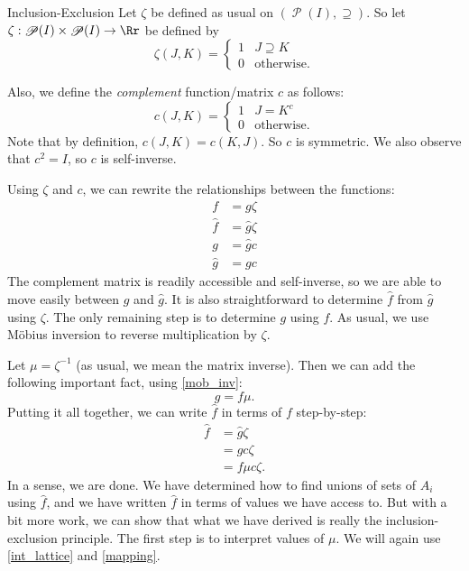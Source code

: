 \documentclass[12pt]{pom_thesis}
\DeclareMathOperator{\ps}{\mathscr{P}}
\begin{document}
\begin{chapter}{Inclusion-Exclusion}
Let $\zeta$ be defined as usual on $(\ps(I), \supseteq)$. So let $\zeta:\ps(I) \times \ps(I) \rightarrow \Rr$ be defined by
\[
\zeta(J,K) = \begin{cases} 1 & J \supseteq K \\ 0 & \text{otherwise}. \end{cases}
\]

Also, we define the \emph{complement} function/matrix $c$ as follows:
\[
c(J,K) = \begin{cases} 1 & J = K^c \\ 0 & \text{otherwise}. \end{cases}
\]
Note that by definition, $c(J,K) = c(K,J)$. So $c$ is symmetric. We also observe that $c^2 = I$, so $c$ is self-inverse. 

Using $\zeta$ and $c$, we can rewrite the relationships between the functions:
\begin{align*}
f &= g\zeta\\
\hat{f} &= \hat{g}\zeta\\
g &= \hat{g}c\\
\hat{g} &= gc
\end{align*}
The complement matrix is readily accessible and self-inverse, so we are able to move easily between $g$ and $\hat{g}$. It is also straightforward to determine $\hat{f}$ from $\hat{g}$ using $\zeta$. The only remaining step is to determine $g$ using $f$. As usual, we use M\"obius inversion to reverse multiplication by $\zeta$.

Let $\mu = \zeta^{-1}$ (as usual, we mean the matrix inverse). Then we can add the following important fact, using \ref{mob_inv}:
\[
g = f\mu.
\]
Putting it all together, we can write $\hat{f}$ in terms of $f$ step-by-step:
\begin{align*}
\hat{f} &= \hat{g}\zeta\\
&= gc\zeta\\
&= f\mu c\zeta.
\end{align*}
In a sense, we are done. We have determined how to find unions of sets of $A_i$ using $\hat{f}$, and we have written $\hat{f}$ in terms of values we have access to. But with a bit more work, we can show that what we have derived is really the inclusion-exclusion principle. The first step is to interpret values of $\mu$. We will again use \ref{int_lattice} and \ref{mapping}. 


\end{chapter}
\end{document}
